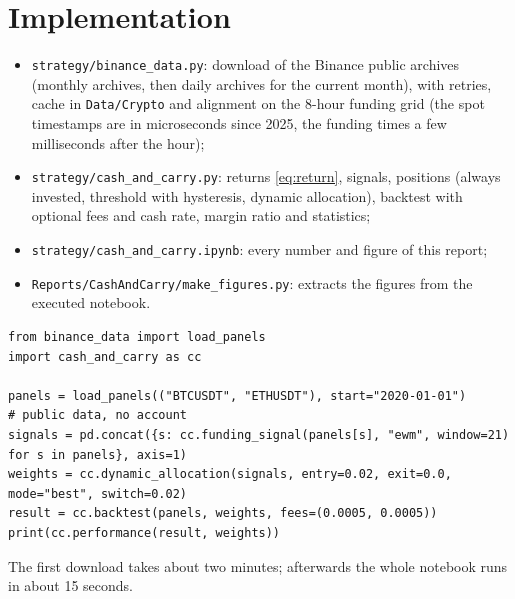 \documentclass[11pt,a4paper]{article}
\newcommand{\code}[1]{\texttt{#1}}
\begin{document}
\section{Implementation}\label{sec:implementation}
\begin{itemize}
\item \code{strategy/binance\_data.py}: download of the Binance public archives (monthly archives, then daily
archives for the current month), with retries, cache in \code{Data/Crypto} and alignment on the 8-hour funding grid
(the spot timestamps are in microseconds since 2025, the funding times a few milliseconds after the hour);
\item \code{strategy/cash\_and\_carry.py}: returns \eqref{eq:return}, signals, positions (always invested, threshold
with hysteresis, dynamic allocation), backtest with optional fees and cash rate, margin ratio and statistics;
\item \code{strategy/cash\_and\_carry.ipynb}: every number and figure of this report;
\item \code{Reports/CashAndCarry/make\_figures.py}: extracts the figures from the executed notebook.
\end{itemize}

\begin{lstlisting}
from binance_data import load_panels
import cash_and_carry as cc

panels = load_panels(("BTCUSDT", "ETHUSDT"), start="2020-01-01")       # public data, no account
signals = pd.concat({s: cc.funding_signal(panels[s], "ewm", window=21) for s in panels}, axis=1)
weights = cc.dynamic_allocation(signals, entry=0.02, exit=0.0, mode="best", switch=0.02)
result = cc.backtest(panels, weights, fees=(0.0005, 0.0005))
print(cc.performance(result, weights))
\end{lstlisting}

The first download takes about two minutes; afterwards the whole notebook runs in about 15 seconds.

\end{document}
